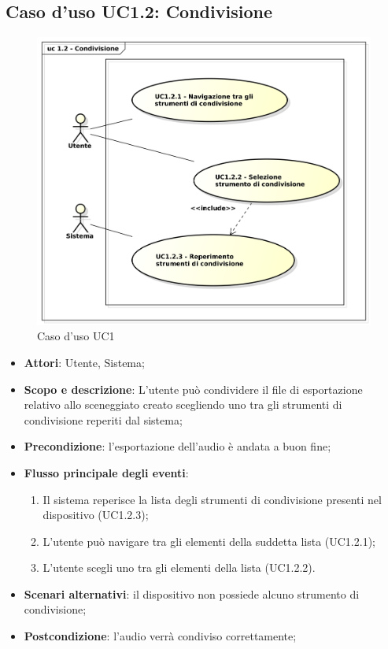 \subsection{Caso d'uso UC1.2: Condivisione}

\begin{figure}[htbp]
\centering
\includegraphics[scale=0.5]{UseCase_17_03_2016/immagini/uc_1_2_condivisione.png}
\captionsetup{labelfont=bf}
\caption{Caso d'uso UC1}
\end{figure}

\begin{itemize}
\item \textbf{Attori}: Utente, Sistema;
\item \textbf{Scopo e descrizione}: L'utente può condividere il file di esportazione relativo allo sceneggiato creato scegliendo uno tra gli strumenti di condivisione reperiti dal sistema;
\item \textbf{Precondizione}: l'esportazione dell'audio è andata a buon fine;
\item \textbf{Flusso principale degli eventi}:
\begin{enumerate}
\item Il sistema reperisce la lista degli strumenti di condivisione presenti nel dispositivo (UC1.2.3);
\item L'utente può navigare tra gli elementi della suddetta lista (UC1.2.1);
\item L'utente scegli uno tra gli elementi della lista (UC1.2.2).
\end{enumerate}
\item \textbf{Scenari alternativi}: il dispositivo non possiede alcuno strumento di condivisione;  
\item \textbf{Postcondizione}: l'audio verrà condiviso correttamente; 
\end{itemize}

